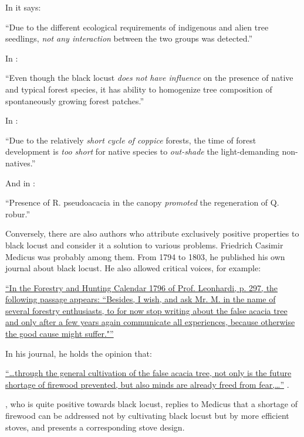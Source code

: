 In \citet{maringer2012robinePostFire} it says:

\enquote{Due to the different ecological requirements of indigenous
  and alien tree seedlings, \emph{not any interaction} between the two
  groups was detected.}

In \citet{petrasova2013neophyten}:

\enquote{Even though the black locust \emph{does not have influence}
  on the presence of native and typical forest species, it has ability
  to homogenize tree composition of spontaneously growing forest
  patches.}

In \citet{radtke2013robinieNiederwald}:

\enquote{Due to the relatively \emph{short cycle of coppice} forests,
  the time of forest development is \emph{too short} for native
  species to \emph{out-shade} the light-demanding non-natives.}

And in \citet{terwei2013nonNative}:

\enquote{Presence of R. pseudoacacia in the canopy \emph{promoted} the
  regeneration of Q. robur.}

Conversely, there are also authors who attribute exclusively positive
properties to black locust and consider it a solution to various problems.
Friedrich Casimir Medicus was probably among them. From 1794 to 1803, he
published his own journal about black locust. He also allowed critical voices,
for example:

\hyperlink{german:medicus1794ffRobinie}{\enquote{In the Forestry and Hunting Calendar 1796 of Prof. Leonhardi,
  p. 297, the following passage appears: “Besides, I wish, and ask Mr. M.
  in the name of several forestry enthusiasts, to for now stop writing
  about the false acacia tree and only after a few years again
  communicate all experiences, because otherwise the good cause might suffer."}} \citep[own translation, Vol. 2, No. 2, p. 3]{medicus1794ffRobinie}

In his journal, he holds the opinion that:

\hyperlink{german:medicus1794ffRobinieB}{\enquote{\dots through the general cultivation of the false acacia tree,
  not only is the future shortage of firewood prevented, but also minds
  are already freed from fear,\dots}}
\citep[own translation, Vol. 1, No. 3, p. 186]{medicus1794ffRobinie}.

\citet{hartig1798robinie}, who is quite positive towards black locust,
replies to Medicus that a shortage of firewood can be addressed not
by cultivating black locust but by more efficient stoves, and presents
a corresponding stove design.


